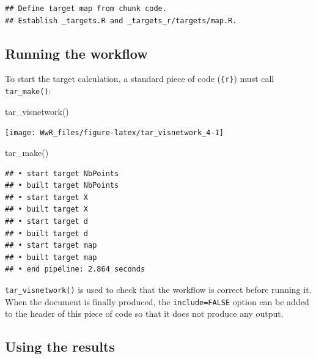 \documentclass[
  12pt,
  american,
  a4paper,
  extrafontsizes,onecolumn,openright
  ]{memoir}
\newenvironment{Shaded}{\begin{snugshade}}{\end{snugshade}}
\newcommand{\FunctionTok}[1]{\textcolor[rgb]{0.00,0.00,0.00}{#1}}
\newcommand{\NormalTok}[1]{#1}
\begin{document}
\begin{verbatim}
## Define target map from chunk code.
## Establish _targets.R and _targets_r/targets/map.R.
\end{verbatim}

\normalsize

\hypertarget{running-the-workflow}{%
\subsection{Running the workflow}\label{running-the-workflow}}

To start the target calculation, a standard piece of code (\texttt{\{r\}}) must call \texttt{tar\_make()}:

\scriptsize

\begin{Shaded}
\begin{Highlighting}[]
\FunctionTok{tar\_visnetwork}\NormalTok{()}
\end{Highlighting}
\end{Shaded}

\begin{center}\texttt{[image: WwR\_files/figure-latex/tar\_visnetwork\_4-1]} \end{center}

\begin{Shaded}
\begin{Highlighting}[]
\FunctionTok{tar\_make}\NormalTok{()}
\end{Highlighting}
\end{Shaded}

\begin{verbatim}
## • start target NbPoints
## • built target NbPoints
## • start target X
## • built target X
## • start target d
## • built target d
## • start target map
## • built target map
## • end pipeline: 2.864 seconds
\end{verbatim}

\normalsize

\texttt{tar\_visnetwork()} is used to check that the workflow is correct before running it.
When the document is finally produced, the \texttt{include=FALSE} option can be added to the header of this piece of code so that it does not produce any output.

\hypertarget{using-the-results}{%
\subsection{Using the results}\label{using-the-results}}
\end{document}
